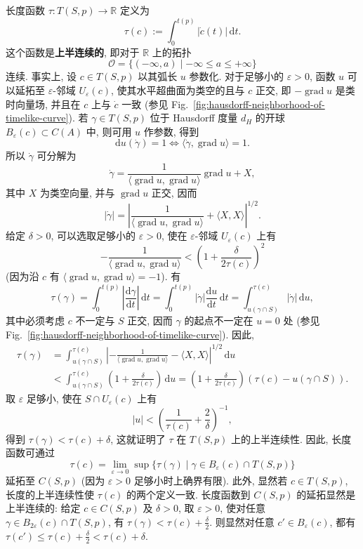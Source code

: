 \begin{RiemannProof}
长度函数 $\tau:T(S,p)\to\mathbb{R}$ 定义为
\[
  \tau(c):=\int_0^{t(p)}|\dot c(t)|\,\mathrm{d}t.
\]
这个函数是\label{idx:hausdorff-upper-semicontinuity}\textbf{上半连续的}, 即对于 $\mathbb{R}$ 上的拓扑
\[
  \mathcal{O}=\{(-\infty,a)\mid-\infty\leq a\leq+\infty\}
\]
连续. 事实上, 设 $c\in T(S,p)$ 以其弧长 $u$ 参数化. 对于足够小的 $\varepsilon>0$, 函数 $u$ 可以延拓至 $\varepsilon$-邻域 $U_\varepsilon(c)$, 使其水平超曲面为类空的且与 $c$ 正交, 即 $-\operatorname{grad}u$ 是类时向量场, 并且在 $c$ 上与 $\dot c$ 一致 (参见 Fig.~\ref{fig:hausdorff-neighborhood-of-timelike-curve}). 若 $\gamma\in T(S,p)$ 位于 Hausdorff 度量 $d_H$ 的开球 $B_\varepsilon(c)\subset C(A)$ 中, 则可用 $u$ 作参数, 得到
\[
  \mathrm{d}u(\dot\gamma)=1\iff\langle\dot\gamma,\operatorname{grad}u\rangle=1.
\]
所以 $\dot\gamma$ 可分解为
\[
  \dot\gamma=\frac{1}{\langle\operatorname{grad}u,\operatorname{grad}u\rangle}
                       \operatorname{grad}u+X,
\]
其中 $X$ 为类空向量, 并与 $\operatorname{grad}u$ 正交, 因而
\[
  |\dot\gamma|=
  \left|\frac{1}{\langle\operatorname{grad}u,\operatorname{grad}u\rangle}
                                         +\langle X,X\rangle\right|^{1/2}.
\]
给定 $\delta>0$, 可以选取足够小的 $\varepsilon>0$, 使在 $\varepsilon$-邻域 $U_\varepsilon(c)$ 上有
\[
  -\frac{1}{\langle\operatorname{grad}u,\operatorname{grad}u\rangle}
     <\left(1+\frac{\delta}{2\tau(c)}\right)^2
\]
(因为沿 $c$ 有 $\langle\operatorname{grad}u,\operatorname{grad}u\rangle=-1$). 有
\[
  \tau(\gamma)=\int_0^{t(p)}\left|\frac{\mathrm{d}\gamma}{\mathrm{d}t}\right|\,\mathrm{d}t
  =\int_0^{t(p)}|\dot\gamma|\frac{\mathrm{d}u}{\mathrm{d}t}\,\mathrm{d}t
  =\int_{u(\gamma\cap S)}^{\tau(c)}|\dot\gamma|\,\mathrm{d}u,
\]
其中必须考虑 $c$ 不一定与 $S$ 正交, 因而 $\gamma$ 的起点不一定在 $u=0$ 处 (参见 Fig.~\ref{fig:hausdorff-neighborhood-of-timelike-curve}). 因此,
\begin{align*}
  \tau(\gamma)
  &=\int_{u(\gamma\cap S)}^{\tau(c)}
     \left|-\frac{1}{\langle\operatorname{grad}u,\operatorname{grad}u\rangle}
                                        -\langle X,X\rangle\right|^{1/2}\,\mathrm{d}u\\
  &<\int_{u(\gamma\cap S)}^{\tau(c)}\left(1+\frac{\delta}{2\tau(c)}\right)\,\mathrm{d}u
    =\left(1+\frac{\delta}{2\tau(c)}\right)(\tau(c)-u(\gamma\cap S)).
\end{align*}
取 $\varepsilon$ 足够小, 使在 $S\cap U_\varepsilon(c)$ 上有
\[
  |u|<\left(\frac{1}{\tau(c)}+\frac{2}{\delta}\right)^{-1},
\]
得到 $\tau(\gamma)<\tau(c)+\delta$, 这就证明了 $\tau$ 在 $T(S,p)$ 上的上半连续性. 因此, 长度函数可通过
\[
  \tau(c)=\lim_{\varepsilon\to0}\sup\{\tau(\gamma)\mid\gamma\in B_\varepsilon(c)\cap T(S,p)\}
\]
延拓至 $C(S,p)$ (因为 $\varepsilon>0$ 足够小时上确界有限). 此外, 显然若 $c\in T(S,p)$, 长度的上半连续性使 $\tau(c)$ 的两个定义一致. 长度函数到 $C(S,p)$ 的延拓显然是上半连续的: 给定 $c\in C(S,p)$ 及 $\delta>0$, 取 $\varepsilon>0$, 使对任意 $\gamma\in B_{2\varepsilon}(c)\cap T(S,p)$, 有 $\tau(\gamma)<\tau(c)+\frac{\delta}{2}$. 则显然对任意 $c'\in B_\varepsilon(c)$, 都有 $\tau(c')\leq\tau(c)+\frac{\delta}{2}<\tau(c)+\delta$.


\end{RiemannProof}
